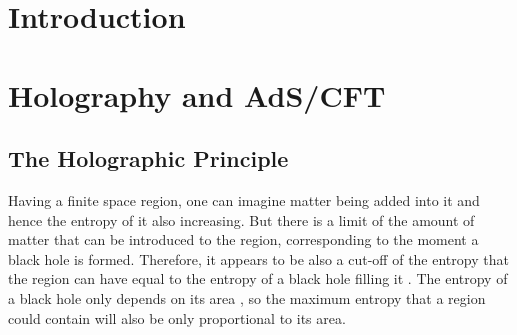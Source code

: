 \documentclass[twocolumn]{revtex4}
\begin{document}


\section{Introduction} \label{s:Intro}


\newpage


\section{Holography and AdS/CFT}


\subsection{The Holographic Principle} \label{ss:Holography}

Having a finite space region, one can imagine matter being added into it and hence the entropy of it also increasing. But there is a limit of the amount of matter that can be introduced to the region, corresponding to the moment a black hole is formed. Therefore, it appears to be also a cut-off of the entropy that the region can have equal to the entropy of a black hole filling it \cite{t_hooft_dimensional_2009}. The entropy of a black hole only depends on its area \cite{bekenstein_black_1973}, so the maximum entropy that a region could contain will also be only proportional to its area.
\end{document}
